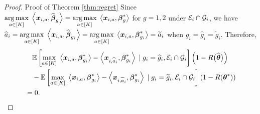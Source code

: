 \begin{proof}{Proof of Theorem \ref{thm:regret}}
Since $\underset{a\in [K]}{\arg \max}\; \left\langle \boldsymbol{x}_{i,a}, \widehat{\boldsymbol{\beta}}_{g} \right\rangle=\underset{a\in [K]}{\arg \max}\; \left\langle \boldsymbol{x}_{i,a}, \boldsymbol{\beta}^*_{g} \right\rangle$ for $g=1,2$ under ${\cal E}_i \cap {\cal G}_i$, we have $\widehat{a}_i = \underset{a\in [K]}{\arg \max}\; \left\langle \boldsymbol{x}_{i,a}, \widehat {\boldsymbol{\beta}}_{g_i} \right\rangle= \underset{a\in [K]}{\arg \max}\; \left\langle \boldsymbol{x}_{i,a}, \boldsymbol{\beta}^*_{g_i} \right\rangle =\widetilde{a}_i$ when $g_i=\hat{g}_i=\tilde{g}_i$. 
Therefore, 
\begin{align*}
	&\quad \mathbb{E}\left[ \underset{a\in [K]}{\max}\; \left\langle \boldsymbol{x}_{i,a}, \boldsymbol{\beta}^*_{g_i} \right\rangle - \left\langle \boldsymbol{x}_{i,\widehat a_i}, \boldsymbol{\beta}^*_{g_i} \right\rangle \;|\; g_i=\widehat{g}_i,  {\cal E}_{i} \cap {\cal G}_{i} \right] \left(1-R\big(\widehat{\boldsymbol{\theta}}\big)\right) \\
	&\quad - \mathbb{E}\left[ \underset{a\in [K]}{\max}\; \left\langle \boldsymbol{x}_{i,a}, \boldsymbol{\beta}^*_{g_i} \right\rangle - \left\langle \boldsymbol{x}_{i,\widetilde a_i}, \boldsymbol{\beta}^*_{g_i} \right\rangle \;|\; g_i=\widetilde{g}_i, {\cal E}_{i} \cap {\cal G}_{i} \right] \left(1-R(\boldsymbol{\theta}^*)\right)\\
	& = 0.
\end{align*}

\end{proof}
